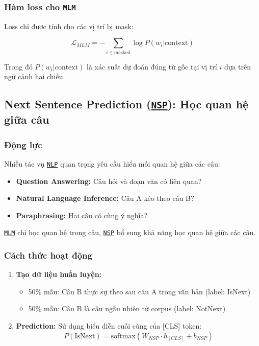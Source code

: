     \subsubsection{Hàm loss cho \hyperref[acro:mlm]{\texttt{MLM}}}
    Loss chỉ được tính cho các vị trí bị mask:
    
    \begin{equation}
    \mathcal{L}_{MLM} = -\sum_{i \in \text{masked}} \log P(w_i | \text{context})
    \label{eq:mlm_loss}
    \end{equation}
    
    Trong đó $P(w_i | \text{context})$ là xác suất dự đoán đúng từ gốc tại vị trí $i$ dựa trên ngữ cảnh hai chiều.
    
    \subsection{Next Sentence Prediction (\hyperref[acro:nsp]{\texttt{NSP}}): Học quan hệ giữa câu}
    \label{ssec:nsp}
    
    \subsubsection{Động lực}
    Nhiều tác vụ \hyperref[acro:nlp]{\texttt{NLP}} quan trọng yêu cầu hiểu mối quan hệ giữa các câu:
    \begin{itemize}
        \item \textbf{Question Answering:} Câu hỏi và đoạn văn có liên quan?
        \item \textbf{Natural Language Inference:} Câu A kéo theo câu B?
        \item \textbf{Paraphrasing:} Hai câu có cùng ý nghĩa?
    \end{itemize}
    
    \hyperref[acro:mlm]{\texttt{MLM}} chỉ học quan hệ trong câu, \hyperref[acro:nsp]{\texttt{NSP}} bổ sung khả năng học quan hệ giữa các câu.
    
    \subsubsection{Cách thức hoạt động}
    \begin{enumerate}
        \item \textbf{Tạo dữ liệu huấn luyện:}
        \begin{itemize}
            \item 50\% mẫu: Câu B thực sự theo sau câu A trong văn bản (label: IsNext)
            \item 50\% mẫu: Câu B là câu ngẫu nhiên từ corpus (label: NotNext)
        \end{itemize}
        
        \item \textbf{Prediction:} Sử dụng biểu diễn cuối cùng của [CLS] token:
        \begin{equation}
        P(\text{IsNext}) = \text{softmax}(W_{NSP} \cdot h_{[CLS]} + b_{NSP})
        \label{eq:nsp_prediction}
        \end{equation}
    \end{enumerate}
    

